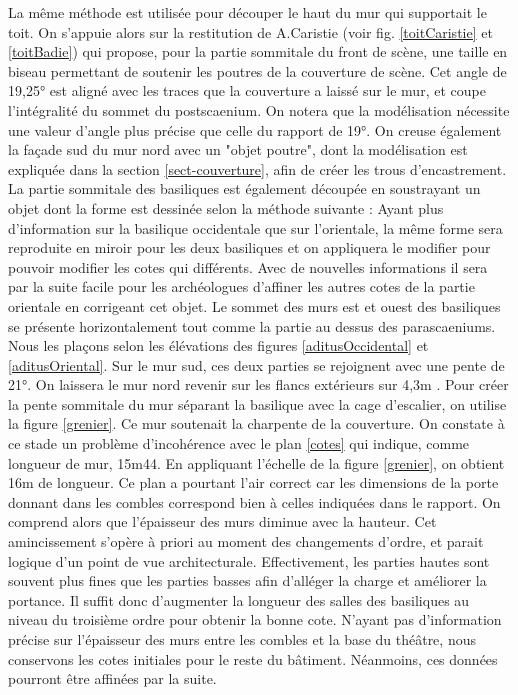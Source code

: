 La même méthode est utilisée pour découper le haut du mur qui supportait le toit. On s'appuie alors sur la restitution de A.Caristie (voir fig. \ref{toitCaristie} et \ref{toitBadie}) qui propose, pour la partie sommitale du front de scène, une taille en biseau permettant de soutenir les poutres de la couverture de scène. Cet angle de 19,25° est aligné avec les traces que la couverture a laissé sur le mur, et coupe l'intégralité du sommet du \gls{postscaenium}. On notera que la modélisation nécessite une valeur d'angle plus précise que celle du rapport \cite{orangeTxt} de 19°. On creuse également la façade sud du mur nord avec un "objet poutre", dont la modélisation est expliquée dans la section \ref{sect-couverture}, afin de créer les trous d'encastrement. La partie sommitale des \glspl{basilique} est également découpée en soustrayant un objet dont la forme est dessinée selon la méthode suivante : 
Ayant plus d'information sur la basilique occidentale que sur l'orientale, la même forme sera reproduite en miroir pour les deux basiliques et on appliquera le modifier pour pouvoir modifier les cotes qui différents. Avec de nouvelles informations il sera par la suite facile pour les archéologues d'affiner les autres cotes de la partie orientale en corrigeant cet objet. Le sommet des murs est et ouest des \glspl{basilique} se présente horizontalement tout comme la partie au dessus des \glspl{parascaenium}. Nous les plaçons selon les élévations des figures \ref{aditusOccidental} et \ref{aditusOriental}. Sur le mur sud, ces deux parties se rejoignent avec une pente de 21°. On laissera le mur nord revenir sur les flancs extérieurs sur 4,3m \cite[p. 38]{orangeTxt}. Pour créer la pente sommitale du mur séparant la \gls{basilique} avec la cage d'escalier, on utilise la figure \ref{grenier}. Ce mur soutenait la charpente de la couverture. On constate à ce stade un problème d'incohérence avec le plan \ref{cotes} qui indique, comme longueur de mur, 15m44. En appliquant l'échelle de la figure \ref{grenier}, on obtient 16m de longueur. Ce plan a pourtant l'air correct car les dimensions de la porte donnant dans les combles correspond bien à celles indiquées dans le rapport. On comprend alors que l'épaisseur des murs diminue avec la hauteur. Cet amincissement s'opère à priori au moment des changements d'ordre, et parait logique d'un point de vue architecturale. Effectivement, les parties hautes sont souvent plus fines que les parties basses afin d'alléger la charge et améliorer la portance. Il suffit donc d'augmenter la longueur des salles des \glspl{basilique} au niveau du troisième ordre pour obtenir la bonne cote. N'ayant pas d'information précise sur l'épaisseur des murs entre les combles et la base du théâtre, nous conservons les cotes initiales pour le reste du bâtiment. Néanmoins, ces données pourront être affinées par la suite.


